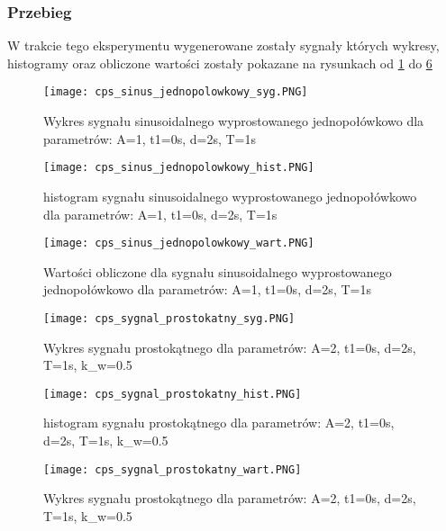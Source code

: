 \documentclass[12pt]{article}
\begin{document}
\subsubsection{Przebieg}
W trakcie tego eksperymentu wygenerowane zostały sygnały których wykresy, histogramy oraz obliczone wartości zostały pokazane na rysunkach od \ref{wykres dla sinusa jednopolowkowego} do \ref{wartosci dla prostokatnego}
\begin{figure}[H]
    \centering
    \texttt{[image: cps\_sinus\_jednopolowkowy\_syg.PNG]}
    \caption{Wykres sygnału sinusoidalnego wyprostowanego jednopołówkowo dla parametrów:  A=1, t1=0s, d=2s, T=1s}
    \label{wykres dla sinusa jednopolowkowego}
\end{figure}
\begin{figure}[H]
    \centering
    \texttt{[image: cps\_sinus\_jednopolowkowy\_hist.PNG]}
    \caption{histogram sygnału sinusoidalnego wyprostowanego jednopołówkowo dla parametrów:  A=1, t1=0s, d=2s, T=1s}
    \label{histogram dla sinusa jednopolowkowego}
\end{figure}
\begin{figure}[H]
    \centering
    \texttt{[image: cps\_sinus\_jednopolowkowy\_wart.PNG]}
    \caption{Wartości obliczone dla sygnału sinusoidalnego wyprostowanego jednopołówkowo dla parametrów:  A=1, t1=0s, d=2s, T=1s}
    \label{wartosci dla sinusa jednopolowkowego}
\end{figure}

\begin{figure}[H]
    \centering
    \texttt{[image: cps\_sygnal\_prostokatny\_syg.PNG]}
    \caption{Wykres sygnału prostokątnego dla parametrów:  A=2, t1=0s, d=2s, T=1s, k_w=0.5}
    \label{wykres dla prostokatnego}
\end{figure}
\begin{figure}[H]
    \centering
    \texttt{[image: cps\_sygnal\_prostokatny\_hist.PNG]}
    \caption{histogram sygnału prostokątnego dla parametrów:  A=2, t1=0s, d=2s, T=1s, k_w=0.5}
    \label{histogram dla prostokatnego}
\end{figure}
\begin{figure}[H]
    \centering
    \texttt{[image: cps\_sygnal\_prostokatny\_wart.PNG]}
    \caption{Wykres sygnału prostokątnego dla parametrów:  A=2, t1=0s, d=2s, T=1s, k_w=0.5}
    \label{wartosci dla prostokatnego}
\end{figure}
\end{document}
